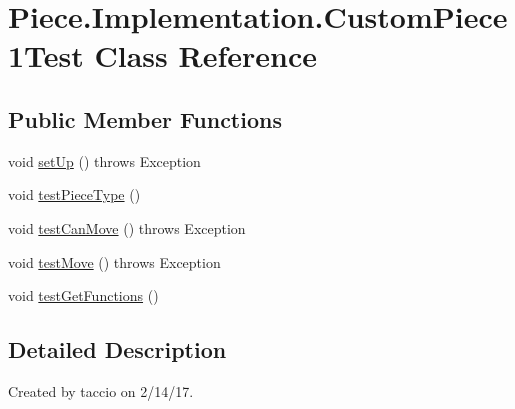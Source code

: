 \hypertarget{classPiece_1_1Implementation_1_1CustomPiece1Test}{\section{Piece.\-Implementation.\-Custom\-Piece1\-Test Class Reference}
\label{classPiece_1_1Implementation_1_1CustomPiece1Test}
}
\subsection*{Public Member Functions}
\begin{DoxyCompactItemize}
\item 
void \hyperlink{classPiece_1_1Implementation_1_1CustomPiece1Test_ae6c652a193ef7c84143df52414c43c74}{set\-Up} ()  throws Exception 
\item 
void \hyperlink{classPiece_1_1Implementation_1_1CustomPiece1Test_a8fe6f1862c04469ec315f147b899b502}{test\-Piece\-Type} ()
\item 
void \hyperlink{classPiece_1_1Implementation_1_1CustomPiece1Test_a746d82cb3a2ab4721ab063d562b29cd5}{test\-Can\-Move} ()  throws Exception
\item 
void \hyperlink{classPiece_1_1Implementation_1_1CustomPiece1Test_a059ef94d70ad425c7dcdf4d26bef54bf}{test\-Move} ()  throws Exception
\item 
void \hyperlink{classPiece_1_1Implementation_1_1CustomPiece1Test_a67af036ffb13cd60098eb39bdcf053a8}{test\-Get\-Functions} ()
\end{DoxyCompactItemize}


\subsection{Detailed Description}
Created by taccio on 2/14/17. 

